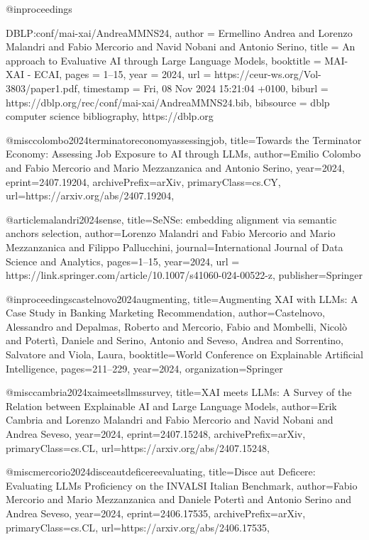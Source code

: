 @inproceedings{DBLP:conf/mai-xai/AndreaMMNS24,
  author       = {Ermellino Andrea and
                  Lorenzo Malandri and
                  Fabio Mercorio and
                  Navid Nobani and
                  Antonio Serino},
  title        = {An approach to Evaluative AI through Large Language Models},
  booktitle    = {MAI-XAI - ECAI},
  pages        = {1--15},
  year         = {2024},
  url          = {https://ceur-ws.org/Vol-3803/paper1.pdf},
  timestamp    = {Fri, 08 Nov 2024 15:21:04 +0100},
  biburl       = {https://dblp.org/rec/conf/mai-xai/AndreaMMNS24.bib},
  bibsource    = {dblp computer science bibliography, https://dblp.org}

@misc{colombo2024terminatoreconomyassessingjob,
      title={Towards the Terminator Economy: Assessing Job Exposure to AI through LLMs}, 
      author={Emilio Colombo and Fabio Mercorio and Mario Mezzanzanica and Antonio Serino},
      year={2024},
      eprint={2407.19204},
      archivePrefix={arXiv},
      primaryClass={cs.CY},
      url={https://arxiv.org/abs/2407.19204}, 
}

@article{malandri2024sense,
  title={SeNSe: embedding alignment via semantic anchors selection},
  author={Lorenzo Malandri and Fabio Mercorio and Mario Mezzanzanica and Filippo Pallucchini},
  journal={International Journal of Data Science and Analytics},
  pages={1--15},
  year={2024},
  url = {https://link.springer.com/article/10.1007/s41060-024-00522-z},
  publisher={Springer}
}

@inproceedings{castelnovo2024augmenting,
  title={Augmenting XAI with LLMs: A Case Study in Banking Marketing Recommendation},
  author={Castelnovo, Alessandro and Depalmas, Roberto and Mercorio, Fabio and Mombelli, Nicolò and Potertì, Daniele and Serino, Antonio and Seveso, Andrea and Sorrentino, Salvatore and Viola, Laura},
  booktitle={World Conference on Explainable Artificial Intelligence},
  pages={211--229},
  year={2024},
  organization={Springer}
}

@misc{cambria2024xaimeetsllmssurvey,
      title={XAI meets LLMs: A Survey of the Relation between Explainable AI and Large Language Models}, 
      author={Erik Cambria and Lorenzo Malandri and Fabio Mercorio and Navid Nobani and Andrea Seveso},
      year={2024},
      eprint={2407.15248},
      archivePrefix={arXiv},
      primaryClass={cs.CL},
      url={https://arxiv.org/abs/2407.15248}, 
}

@misc{mercorio2024disceautdeficereevaluating,
      title={Disce aut Deficere: Evaluating LLMs Proficiency on the INVALSI Italian Benchmark}, 
      author={Fabio Mercorio and Mario Mezzanzanica and Daniele Potertì and Antonio Serino and Andrea Seveso},
      year={2024},
      eprint={2406.17535},
      archivePrefix={arXiv},
      primaryClass={cs.CL},
      url={https://arxiv.org/abs/2406.17535}, 
}


}
